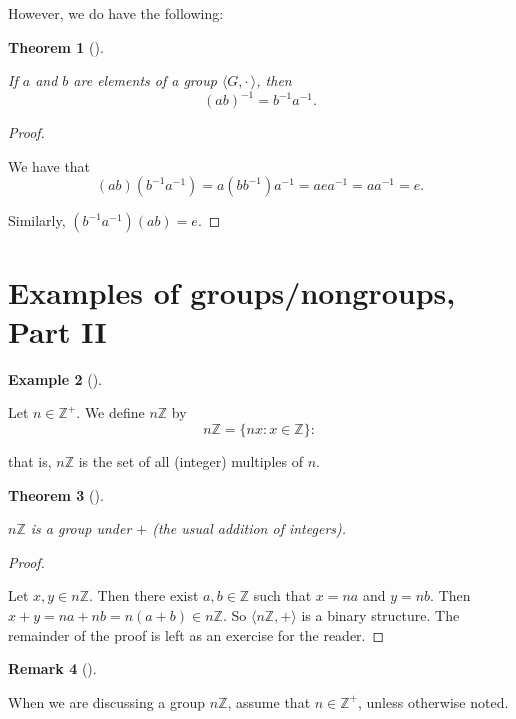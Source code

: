 \documentclass[10pt,]{book}
\theoremstyle{plain}
\newtheorem{theorem}{Theorem}[section]
\theoremstyle{definition}
\theoremstyle{definition}
\newtheorem{remark}[theorem]{Remark}
\theoremstyle{definition}
\newtheorem{example}[theorem]{Example}
\theoremstyle{definition}
\numberwithin{equation}{section}
\def\Z{\mathbb{Z}}
\def\Gdot{\langle G, \cdot\,\rangle}
\begin{document}
      However, we do have the following:
\begin{theorem}[{}]\label{invofprod}

          If \(a\) and \(b\) are elements of a group \(\Gdot\), then
\begin{equation*}

            (ab)^{-1}=b^{-1}a^{-1}.
          
\end{equation*}

\end{theorem}
\begin{proof}\hypertarget{proof-12}{}

        We have that
\begin{equation*}

          (ab)(b^{-1}a^{-1})=a(bb^{-1})a^{-1}=aea^{-1}=aa^{-1}=e.
        
\end{equation*}

\par

        Similarly, \((b^{-1}a^{-1})(ab)=e\).
\end{proof}
\typeout{************************************************}
\typeout{************************************************}
\section[{Examples of groups/nongroups, Part II}]{Examples of groups/nongroups, Part II}\label{section-8}
\begin{example}[]\label{example-16}

      Let \(n\in \Z^+\). We define \(n\Z\) by
\begin{equation*}

        n\Z=\{nx: x\in \Z\}:
      
\end{equation*}

      that is, \(n\Z\) is the set of all (integer) multiples of \(n\).
\label{notation-39}
\end{example}
\begin{theorem}[{}]\label{nz}

          \(n\Z\) is a group under \(+\) (the usual addition of integers).
\end{theorem}
\begin{proof}\hypertarget{proof-13}{}

        Let \(x, y\in n\Z\). Then there exist \(a,b\in \Z\) such that \(x=na\) and \(y=nb\). Then \(x+y=na+nb=n(a+b)\in n\Z\). So \(\langle n\Z,+\rangle\) is a binary structure. The remainder of the proof is left as an exercise for the reader.
\end{proof}
\begin{remark}[]\label{remark-12}

      When we are discussing a group \(n\Z\), assume that \(n\in \Z^+\), unless otherwise noted.
\end{remark}
\end{document}
